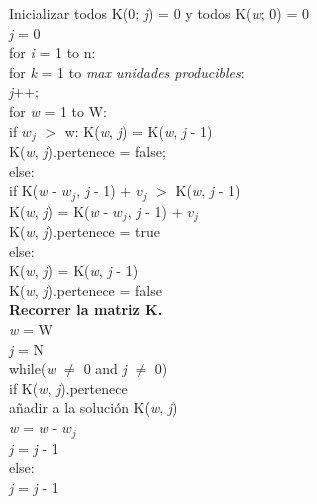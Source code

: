 \documentclass[es]{ifirak}
\begin{document}
Inicializar todos K(0; \textit{j}) = 0 y todos K(\textit{\textit{w}}; 0) = 0\\
\hspace*{0.4cm} \textit{j} = 0\\
\hspace*{0.4cm} for \textit{i} = 1 to n:\\
\hspace*{0.9cm} for \textit{k} = 1 to\textit{ max unidades producibles}:\\
\hspace*{0.9cm} \textit{j}++;\\
\hspace*{1.4cm} for \textit{w} = 1 to W:\\
\hspace*{1.9cm} if $w_{j}$ $>$ w: K(\textit{w}, \textit{j}) = K(\textit{w}, \textit{j} - 1)\\
\hspace*{2.4cm} K(\textit{w}, \textit{j}).pertenece = false;\\
\hspace*{1.9cm} else:\\
\hspace*{2.4cm} if K(\textit{w} - $w_{j}$, \textit{j} - 1) + $v_{j}$ $>$ K(\textit{w}, \textit{j} - 1)\\
\hspace*{2.9cm} K(\textit{w}, \textit{j}) = K(\textit{w} - $w_{j}$, \textit{j} - 1) + $v_{j}$\\
\hspace*{2.9cm} K(\textit{w}, \textit{j}).pertenece = true\\
\hspace*{2.4cm} else:\\
\hspace*{2.9cm} K(\textit{w}, \textit{j}) = K(\textit{w}, \textit{j} - 1)\\
\hspace*{2.9cm} K(\textit{w}, \textit{j}).pertenece = false\\

\textbf{Recorrer la matriz K.}\\

\textit{w} = W\\
\hspace*{0.4cm} \textit{j} = N\\
\hspace*{0.4cm} while(\textit{w} $\neq$ 0 and \textit{j} $\neq$  0)\\
\hspace*{0.9cm} if K(\textit{w}, \textit{j}).pertenece\\
\hspace*{1.4cm} añadir a la solución K(\textit{w}, \textit{j})\\
\hspace*{1.4cm} \textit{w} = \textit{w} - $w_{j}$\\
\hspace*{1.4cm} \textit{j} = \textit{j} - 1\\
\hspace*{0.9cm} else:\\
\hspace*{1.4cm} \textit{j} = \textit{j} - 1\\
 
\end{document}
